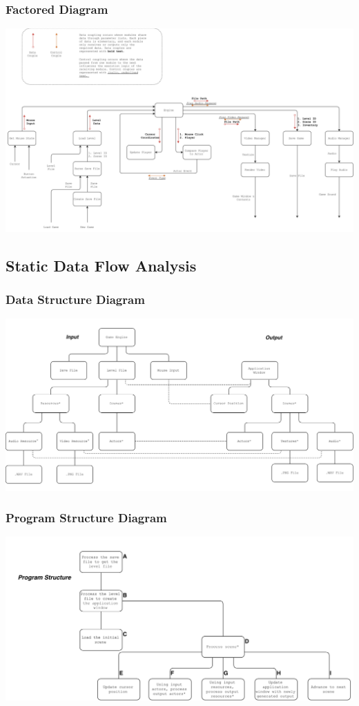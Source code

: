 \documentclass{article}
\begin{document}
		\subsubsection{Factored Diagram}
			\begin{center}
				\includegraphics[scale=0.36,angle=90]{ddfFactored.png}
			\end{center}
	\subsection{Static Data Flow Analysis}
		\subsubsection{Data Structure Diagram}
			\begin{center}
				\includegraphics[scale=0.45,angle=90]{Jackson1.png}
			\end{center}
		\subsubsection{Program Structure Diagram}
			\begin{center}
				\includegraphics[scale=0.5,angle=90]{Jackson2.png}
			\end{center}
\end{document}
